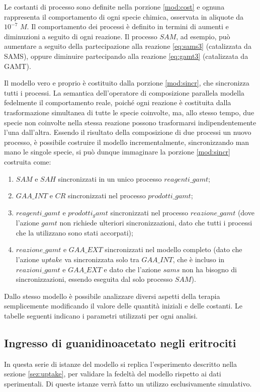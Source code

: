 Le costanti di processo sono definite nella porzione \ref{mod:cost} e ognuna rappresenta il comportamento di ogni specie chimica, osservata in aliquote da $10^{-7}$ $M$.
Il comportamento dei processi \`e definito in termini di aumenti e diminuzioni a seguito di ogni reazione.
Il processo $SAM$, ad esempio, pu\`o aumentare a seguito della partecipazione alla reazione \ref{eq:sams3} (catalizzata da SAMS), oppure diminuire partecipando alla reazione \ref{eq:gamt3} (catalizzata da GAMT).

Il modello vero e proprio \`e costituito dalla porzione \ref{mod:sincr}, che sincronizza tutti i processi. La semantica dell'operatore di composizione parallela modella fedelmente il comportamento reale, poich\'e ogni reazione \`e costituita dalla trasformazione simultanea di tutte le specie coinvolte, ma, allo stesso tempo, due specie non coinvolte nella stessa reazione possono trasformarsi indipendentemente l'una dall'altra.
Essendo il risultato della composizione di due processi un nuovo processo, \`e possibile costruire il modello incrementalmente, sincronizzando man mano le singole specie, si pu\`o dunque immaginare la porzione \ref{mod:sincr} costruita come:
\begin{enumerate}
	\item $SAM$ e $SAH$ sincronizzati in un unico processo $reagenti\_gamt$;
	\item $GAA\_INT$ e $CR$ sincronizzati nel processo $prodotti\_gamt$;
	\item $reagenti\_gamt$ e $prodotti_gamt$ sincronizzati nel processo $reazione\_gamt$ (dove l'azione $gamt$ non richiede ulteriori sincronizzazioni, dato che tutti i processi che la utilizzano sono stati accorpati);
	\item $reazione\_gamt$ e $GAA\_EXT$ sincronizzati nel modello completo (dato che l'azione $uptake$ va sincronizzata solo tra $GAA\_INT$, che \`e incluso in $reazioni\_gamt$ e $GAA\_EXT$ e dato che l'azione $sams$ non ha bisogno di sincronizzazioni, essendo eseguita dal solo processo $SAM$).
	
\end{enumerate}

Dallo stesso modello \`e possibile analizzare diversi aspetti della terapia semplicemente modificando il valore delle quantit\`a iniziali e delle costanti. Le tabelle seguenti indicano i parametri utilizzati per ogni analisi.

\subsection{Ingresso di guanidinoacetato negli eritrociti}
In questa serie di istanze del modello si replica l'esperimento descritto nella sezione \ref{sez:uptake}, per validare la fedelt\`a del modello rispetto ai dati sperimentali.
Di queste istanze verr\`a fatto un utilizzo esclusivamente simulativo.

